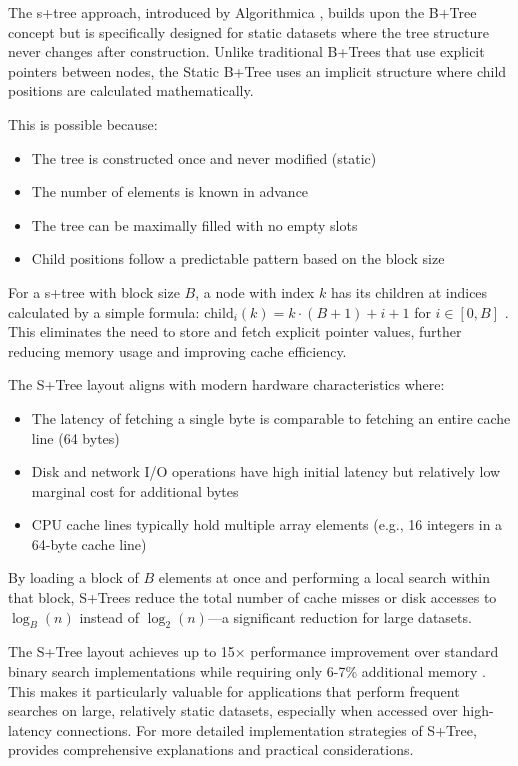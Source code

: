 The \ac{s+tree} approach, introduced by Algorithmica \citep{static_b_trees}, builds upon the B+Tree concept but is specifically designed for static datasets where the tree structure never changes after construction. Unlike traditional B+Trees that use explicit pointers between nodes, the Static B+Tree uses an implicit structure where child positions are calculated mathematically.

This is possible because:
\begin{itemize}
  \item The tree is constructed once and never modified (static)
  \item The number of elements is known in advance
  \item The tree can be maximally filled with no empty slots
  \item Child positions follow a predictable pattern based on the block size
\end{itemize}

For a \ac{s+tree} with block size $B$, a node with index $k$ has its children at indices calculated by a simple formula: $\text{child}_i(k) = k \cdot (B+1) + i + 1$ for $i \in [0, B]$ \citep{static_b_trees}. This eliminates the need to store and fetch explicit pointer values, further reducing memory usage and improving cache efficiency.

The S+Tree layout aligns with modern hardware characteristics where:
\begin{itemize}
  \item The latency of fetching a single byte is comparable to fetching an entire cache line (64 bytes)
  \item Disk and network I/O operations have high initial latency but relatively low marginal cost for additional bytes
  \item CPU cache lines typically hold multiple array elements (e.g., 16 integers in a 64-byte cache line)
\end{itemize}

By loading a block of $B$ elements at once and performing a local search within that block, S+Trees reduce the total number of cache misses or disk accesses to $\log_B(n)$ instead of $\log_2(n)$—a significant reduction for large datasets.

The S+Tree layout achieves up to 15× performance improvement over standard binary search implementations while requiring only 6-7\% additional memory \citep{static_b_trees}. This makes it particularly valuable for applications that perform frequent searches on large, relatively static datasets, especially when accessed over high-latency connections. For more detailed implementation strategies of S+Tree, \citet{koerkamp_2024} provides comprehensive explanations and practical considerations.